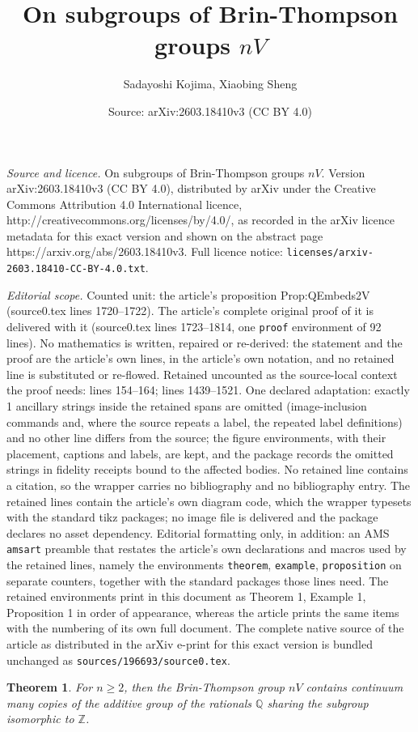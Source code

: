 \documentclass[10pt,a4paper]{amsart}
\title{On subgroups of Brin-Thompson groups $nV$}
\author{Sadayoshi Kojima, Xiaobing Sheng}
\date{Source: arXiv:2603.18410v3 (CC BY 4.0)}
\newtheorem{theorem}{Theorem}
\begin{document}
\maketitle

\noindent\emph{Source and licence.} On subgroups of Brin-Thompson groups $nV$. Version arXiv:2603.18410v3 (CC BY 4.0), distributed by arXiv under the Creative Commons Attribution 4.0 International licence, http://creativecommons.org/licenses/by/4.0/, as recorded in the arXiv licence metadata for this exact version and shown on the abstract page https://arxiv.org/abs/2603.18410v3. Full licence notice: \texttt{licenses/arxiv-2603.18410-CC-BY-4.0.txt}.\par\smallskip

\noindent\textit{Editorial scope.} Counted unit: the article's proposition Prop:QEmbeds2V (source0.tex lines 1720--1722). The article's complete original proof of it is delivered with it (source0.tex lines 1723--1814, one \texttt{proof} environment of 92 lines). No mathematics is written, repaired or re-derived: the statement and the proof are the article's own lines, in the article's own notation, and no retained line is substituted or re-flowed.  Retained uncounted as the source-local context the proof needs: lines 154--164; lines 1439--1521.  One declared adaptation: exactly 1 ancillary strings inside the retained spans are omitted (image-inclusion commands and, where the source repeats a label, the repeated label definitions) and no other line differs from the source; the figure environments, with their placement, captions and labels, are kept, and the package records the omitted strings in fidelity receipts bound to the affected bodies.  No retained line contains a citation, so the wrapper carries no bibliography and no bibliography entry.  The retained lines contain the article's own diagram code, which the wrapper typesets with the standard tikz packages; no image file is delivered and the package declares no asset dependency.  Editorial formatting only, in addition: an AMS \texttt{amsart} preamble that restates the article's own declarations and macros used by the retained lines, namely the environments \texttt{theorem}, \texttt{example}, \texttt{proposition} on separate counters, together with the standard packages those lines need.  The retained environments print in this document as Theorem 1, Example 1, Proposition 1 in order of appearance, whereas the article prints the same items with the numbering of its own full document.  The complete native source of the article as distributed in the arXiv e-print for this exact version is bundled unchanged as \texttt{sources/196693/source0.tex}.
\begin{theorem}\label{Thm:Main2} 
        For $n \geq 2$,  
	then the Brin-Thompson group  $nV$  contains continuum many copies of
	the additive group of the rationals  $\mathbb{Q}$  sharing 
	the subgroup isomorphic to  $\mathbb{Z}$.  
\end{theorem} 
\end{document}
